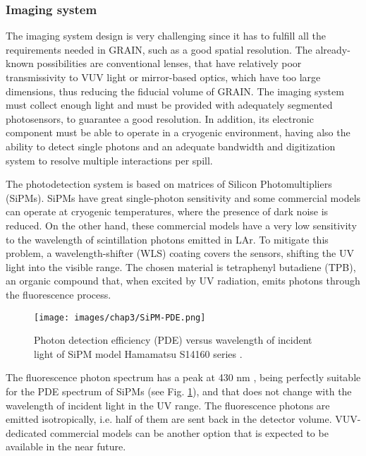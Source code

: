 \subsubsection{Imaging system}
The imaging system design is very challenging since it has to fulfill all the requirements needed in GRAIN, such as a good spatial resolution. The already-known possibilities are conventional lenses, that have relatively poor transmissivity to VUV light or mirror-based optics, which have too large dimensions, thus reducing the fiducial volume of GRAIN. The imaging system must collect enough light and must be provided with adequately segmented photosensors, to guarantee a good resolution. In addition, its electronic component must be able to operate in a cryogenic environment, having also the ability to detect single photons and an adequate bandwidth and digitization system to resolve multiple interactions per spill. 

The photodetection system is based on matrices of Silicon Photomultipliers (SiPMs). SiPMs have great single-photon sensitivity and some commercial models can operate at cryogenic temperatures, where the presence of dark noise is reduced.  On the other hand, these commercial models have a very low sensitivity to the wavelength of scintillation photons emitted in LAr. To mitigate this problem, a wavelength-shifter (WLS) coating covers the sensors, shifting the UV light into the visible range. The chosen material is tetraphenyl butadiene (TPB), an organic compound that, when excited by UV radiation, emits photons through the fluorescence process. 

\begin{figure}[h!]
    \centering
    \texttt{[image: images/chap3/SiPM-PDE.png]}
    \caption{Photon detection efficiency (PDE) versus wavelength of incident light of SiPM model Hamamatsu S14160 series \cite{SiPM-hamamatsu}.}
    \label{fig:SiPM-PDE}
\end{figure}

The fluorescence photon spectrum has a peak at 430 nm \cite{SiPM-hamamatsu}, being perfectly suitable for the PDE spectrum of SiPMs (see Fig. \ref{fig:SiPM-PDE}), and that does not change with the wavelength of incident light in the UV range. The fluorescence photons are emitted isotropically, i.e. half of them are sent back in the detector volume. VUV-dedicated commercial models can be another option that is expected to be available in the near future.

